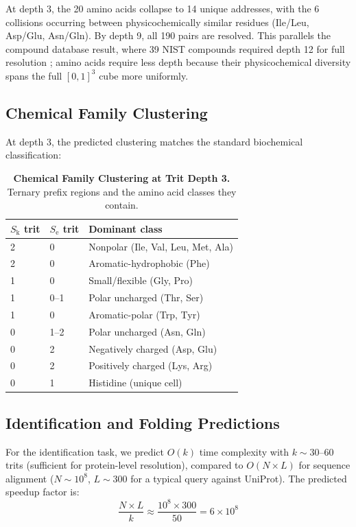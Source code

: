 \documentclass[11pt,twocolumn,a4paper]{article}
\theoremstyle{definition}
\theoremstyle{remark}
\newcommand{\Sk}{S_{\mathrm{k}}}
\newcommand{\Se}{S_{\mathrm{e}}}
\begin{document}
At depth 3, the 20 amino acids collapse to 14 unique addresses, with the 6 collisions occurring between physicochemically similar residues (Ile/Leu, Asp/Glu, Asn/Gln). By depth 9, all 190 pairs are resolved. This parallels the compound database result, where 39 NIST compounds required depth 12 for full resolution \citep{sachikonye2025a}; amino acids require less depth because their physicochemical diversity spans the full $[0,1]^3$ cube more uniformly.

\subsection{Chemical Family Clustering}

At depth 3, the predicted clustering matches the standard biochemical classification:

\begin{table}[H]
\centering
\caption{\textbf{Chemical Family Clustering at Trit Depth 3.} Ternary prefix regions and the amino acid classes they contain.}
\label{tab:clustering}
\begin{tabular}{@{}lll@{}}
\toprule
$\Sk$ trit & $\Se$ trit & Dominant class \\
\midrule
2 & 0 & Nonpolar (Ile, Val, Leu, Met, Ala) \\
2 & 0 & Aromatic-hydrophobic (Phe) \\
1 & 0 & Small/flexible (Gly, Pro) \\
1 & 0--1 & Polar uncharged (Thr, Ser) \\
1 & 0 & Aromatic-polar (Trp, Tyr) \\
0 & 1--2 & Polar uncharged (Asn, Gln) \\
0 & 2 & Negatively charged (Asp, Glu) \\
0 & 2 & Positively charged (Lys, Arg) \\
0 & 1 & Histidine (unique cell) \\
\bottomrule
\end{tabular}
\end{table}

\subsection{Identification and Folding Predictions}

For the identification task, we predict $O(k)$ time complexity with $k \sim 30$--$60$ trits (sufficient for protein-level resolution), compared to $O(N \times L)$ for sequence alignment ($N \sim 10^8$, $L \sim 300$ for a typical query against UniProt). The predicted speedup factor is:
\begin{equation}
\frac{N \times L}{k} \approx \frac{10^8 \times 300}{50} = 6 \times 10^8
\end{equation}
\end{document}
